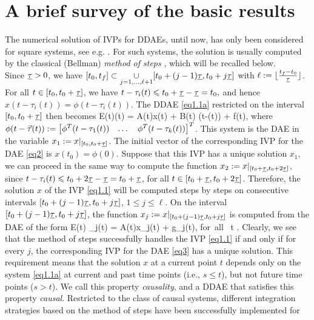 \documentclass[final,reqno]{siamltex}
\begin{document}
\section{A brief survey of the basic results}
%
The numerical solution of IVPs for DDAEs, until now, has only been considered for square systems, see e.g. 
\cite{AscP95,BakPT02,CamL09,GugH07,Liu99,ShaG06,TiaYK11,ZhuP97,ZhuP98}. 
For such systems, the solution is usually computed by the classical (Bellman) \emph{method of steps} \cite{Bel61,BelC63,BelC65}, which will be recalled below.\\
Since $\underline{\tau}>0$, we have $[t_0,t_f] \subset \underset{j=1,\dots,\ell+1}{\cup} [t_0+(j-1)\underline{\tau},t_0+j\underline{\tau}]$ 
with $\ell := \lfloor \frac{t_f-t_0}{\underline{\tau}} \rfloor$.
For all $t \in [t_0,t_0+\underline{\tau}]$, we have $t-\tau_i(t) \leqslant t_0 + \underline{\tau} - \underline{\tau} = t_0,$ and hence $x(t-\tau_i(t)) = \phi(t-\tau_i(t))$.
The DDAE \eqref{eq1.1a} restricted on the interval $[t_0,t_0+\underline{\tau}]$ then becomes
%
\be\label{eq2}
 E(t)(t) = A(t)x(t) + B(t) \phi(t-\vtau(t)) + f(t),
\ee
%
where $\phi(t-\vec{\tau}(t)) := \begin{bmatrix} \phi^T(t-\tau_1(t)) & \dots & \phi^T(t-\tau_k(t)) \end{bmatrix}^T$. 
This system is the DAE in the variable $x_1 := x|_{[t_0,t_0+\underline{\tau}]}$. The initial vector of the corresponding IVP for the DAE \eqref{eq2} is $x(t_0)=\phi(0)$.
Suppose that this IVP has a unique solution $x_1$, we can proceed in the same way to compute the function $x_2 := x|_{[t_0+\underline{\tau},t_0+2\underline{\tau}]}$, since 
$t-\tau_i(t) \leqslant t_0 + 2 \underline{\tau} - \underline{\tau} = t_0+\underline{\tau}$, for all $t\in [t_0+\underline{\tau},t_0+2\underline{\tau}]$. Therefore, the solution $x$ of the IVP \eqref{eq1.1} will be 
computed steps by steps on consecutive intervals $[t_0+(j-1)\underline{\tau},t_0+j\underline{\tau}]$, $1\leq j\leq \ell$. 
On the interval $[t_0+(j-1)\underline{\tau},t_0+j\underline{\tau}]$, the function $x_j := x|_{[t_0+(j-1)\underline{\tau},t_0+j\underline{\tau}]}$ is computed from the DAE of the form
%
\be\label{eq3}
 E(t) _j(t) = A(t)x_j(t) + g_j(t), \quad \mbox{for all } t .
\ee
%
Clearly, we see that the method of steps successfully handles the IVP \eqref{eq1.1} if and only if for every $j$, the corresponding IVP for the 
DAE \eqref{eq3} has a unique solution.
This requirement means that the solution $x$ at a current point $t$ depends only on the system \eqref{eq1.1a} 
at current and past time points (i.e., $s \leq t$), but not future time points ($s > t$). We call this property \emph{causality}, and 
a DDAE that satisfies this property \emph{causal}. 
Restricted to the class of causal systems, different integration strategies based on the method of steps have been successfully implemented for 
\end{document}

